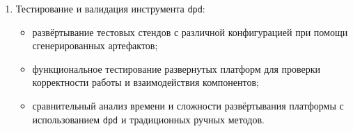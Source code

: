 \begin{enumerate}
    \item Тестирование и валидация инструмента \texttt{dpd}:
          \begin{itemize}
              \item развёртывание тестовых стендов с различной конфигурацией при помощи сгенерированных артефактов;
              \item функциональное тестирование развернутых платформ для проверки корректности работы и взаимодействия компонентов;
              \item сравнительный анализ времени и сложности развёртывания платформы с использованием \texttt{dpd} и традиционных ручных методов.
          \end{itemize}
\end{enumerate}

